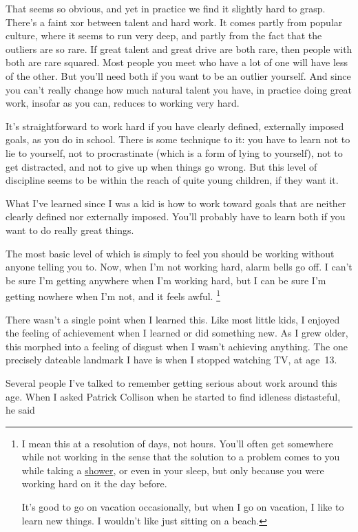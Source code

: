 \documentclass[12pt]{book}
\begin{document}
That seems so obvious, and yet in practice we find it slightly hard to
grasp. There's a faint xor between talent and hard work. It comes partly
from popular culture, where it seems to run very deep, and partly from
the fact that the outliers are so rare. If great talent and great drive
are both rare, then people with both are rare squared. Most people you
meet who have a lot of one will have less of the other. But you'll need
both if you want to be an outlier yourself. And since you can't really
change how much natural talent you have, in practice doing great work,
insofar as you can, reduces to working very hard.

It's straightforward to work hard if you have clearly defined,
externally imposed goals, as you do in school. There is some technique
to it: you have to learn not to lie to yourself, not to procrastinate
(which is a form of lying to yourself), not to get distracted, and not
to give up when things go wrong. But this level of discipline seems to
be within the reach of quite young children, if they want it.

What I've learned since I was a kid is how to work toward goals that are
neither clearly defined nor externally imposed. You'll probably have to
learn both if you want to do really great things.

The most basic level of which is simply to feel you should be working
without anyone telling you to. Now, when I'm not working hard, alarm
bells go off. I can't be sure I'm getting anywhere when I'm working
hard, but I can be sure I'm getting nowhere when I'm not, and it feels
awful. \footnote{I mean this at a resolution of days, not hours. You'll often get
somewhere while not working in the sense that the solution to a problem
comes to you while taking a \href{top.html}{shower}, or even in your
sleep, but only because you were working hard on it the day before.

It's good to go on vacation occasionally, but when I go on vacation, I
like to learn new things. I wouldn't like just sitting on a beach.}

There wasn't a single point when I learned this. Like most little kids,
I enjoyed the feeling of achievement when I learned or did something
new. As I grew older, this morphed into a feeling of disgust when I
wasn't achieving anything. The one precisely dateable landmark I have is
when I stopped watching TV, at age~13.

Several people I've talked to remember getting serious about work around
this age. When I asked Patrick Collison when he started to find idleness
distasteful, he said
\end{document}
